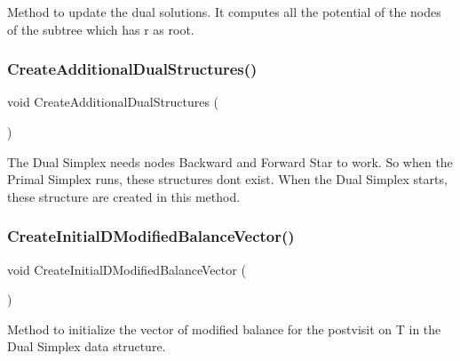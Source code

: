Method to update the dual solutions. It computes all the potential of the nodes of the subtree which has r as root. \mbox{\label{class_m_c_f_simplex_a3307d3095386f58161d35f0b22222193}} 
\subsubsection{\texorpdfstring{Create\+Additional\+Dual\+Structures()}{CreateAdditionalDualStructures()}}
{\footnotesize\ttfamily void Create\+Additional\+Dual\+Structures (\begin{DoxyParamCaption}\item[{void}]{ }\end{DoxyParamCaption})\hspace{0.3cm}{\ttfamily [private]}}

The Dual Simplex needs nodes\textquotesingle{} Backward and Forward Star to work. So when the Primal Simplex runs, these structures don\textquotesingle{}t exist. When the Dual Simplex starts, these structure are created in this method. \mbox{\label{class_m_c_f_simplex_a9ce3f3e0f7f55dd953f4bef653381251}} 
\subsubsection{\texorpdfstring{Create\+Initial\+D\+Modified\+Balance\+Vector()}{CreateInitialDModifiedBalanceVector()}}
{\footnotesize\ttfamily void Create\+Initial\+D\+Modified\+Balance\+Vector (\begin{DoxyParamCaption}\item[{void}]{ }\end{DoxyParamCaption})\hspace{0.3cm}{\ttfamily [private]}}

Method to initialize the vector of modified balance for the postvisit on T in the Dual Simplex data structure. \mbox{\label{class_m_c_f_simplex_ab247de21b7c3808df5b8b31731f29c28}} 
